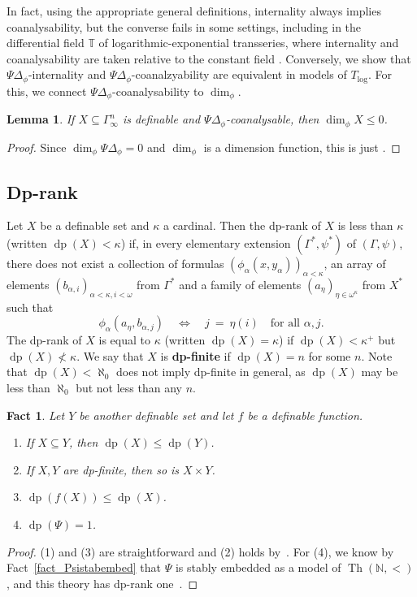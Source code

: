 \documentclass[11pt]{amsart}
\theoremstyle{plain}
\newtheorem{lemma}[thm]{Lemma}
\newtheorem{fact}[thm]{Fact}
\theoremstyle{definition}
\numberwithin{equation}{section}
\newcommand\N{\mathbb{N}}
\newcommand\0{\varnothing}
\DeclareMathOperator\Th{Th}
\DeclareMathOperator\dpr{dp}
\begin{document}
\noindent
In fact, using the appropriate general definitions, internality always implies coanalysability, but the converse fails in some settings, including in the differential field $\mathbb{T}$ of logarithmic-exponential transseries, where internality and coanalysability are taken relative to the constant field \cite{adh-dimension}.
Conversely, we show that $\Psi\Delta_{\phi}$-internality and $\Psi\Delta_{\phi}$-coanalzyability are equivalent in models of $T_{\log}$.
For this, we connect $\Psi\Delta_{\phi}$-coanalysability to $\dim_{\phi}$.
\begin{lemma}\label{lem_coanaldphi0}
If $X \subseteq \Gamma^n_{\infty}$ is definable and $\Psi\Delta_{\phi}$-coanalysable, then $\dim_{\phi}X\leq 0$.
\end{lemma}
\begin{proof}
Since $\dim_{\phi}\Psi\Delta_{\phi}=0$ and $\dim_{\phi}$ is a dimension function, this is just \cite[Corollary~2.9]{angel2016bounded}.
\end{proof}


\subsection{Dp-rank}\label{dp_rank_subsection}
 

Let $X$ be a definable set and $\kappa$ a cardinal. Then the dp-rank of $X$ is less than $\kappa$ (written $\dpr(X)<\kappa$) if, in every elementary extension $(\Gamma^*,\psi^*)$ of $(\Gamma,\psi)$, there does not exist a collection of formulas $(\phi_{\alpha}(x,y_{\alpha}))_{\alpha<\kappa}$, an array of elements $(b_{\alpha,i})_{\alpha<\kappa,i<\omega}$ from $\Gamma^*$ and a family of elements $(a_{\eta})_{\eta\in\omega^{\kappa}}$ from $X^*$ such that
\[
\phi_{\alpha}(a_{\eta},b_{\alpha,j}) \quad \iff \quad j \ = \ \eta(i)\quad\text{for all $\alpha,j$.}
\]
The dp-rank of $X$ is equal to $\kappa$ (written $\dpr(X) = \kappa$) if $\dpr(X) < \kappa^+$ but $\dpr(X) \not< \kappa$. We say that $X$ is \textbf{dp-finite} if $\dpr(X)=n$ for some $n$. Note that $\dpr(X) <\aleph_0$ does not imply dp-finite in general, as $\dpr(X)$ may be less than $\aleph_0$ but not less than any $n$.

\begin{fact}\label{dpfacts}
Let $Y$ be another definable set and let $f$ be a definable function.
\begin{enumerate}
\item If $X \subseteq Y$, then $\dpr(X)\leq \dpr(Y)$.
\item If $X,Y$ are dp-finite, then so is $X\times Y$. 
\item $\dpr(f(X)) \leq \dpr(X)$. 
\item $\dpr(\Psi) = 1$.
\end{enumerate}
\end{fact}
\begin{proof}
(1) and (3) are straightforward and (2) holds by~\cite{KOU13}. For (4), we know by Fact~\ref{fact_Psistabembed} that $\Psi$ is stably embedded as a model of $\Th(\N,<)$, and this theory has dp-rank one~\cite{DGL11}.
\end{proof}
\end{document}
